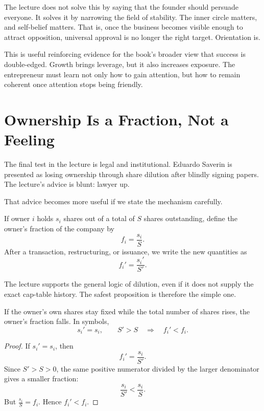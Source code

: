 \documentclass[11pt,oneside]{book}
\begin{document}
The lecture does not solve this by saying that the founder should persuade everyone. It solves it by narrowing the field of stability. The inner circle matters, and self-belief matters. That is, once the business becomes visible enough to attract opposition, universal approval is no longer the right target. Orientation is.

This is useful reinforcing evidence for the book's broader view that success is double-edged. Growth brings leverage, but it also increases exposure. The entrepreneur must learn not only how to gain attention, but how to remain coherent once attention stops being friendly.

\section{Ownership Is a Fraction, Not a Feeling}

The final test in the lecture is legal and institutional. Eduardo Saverin is presented as losing ownership through share dilution after blindly signing papers. The lecture's advice is blunt: lawyer up.

That advice becomes more useful if we state the mechanism carefully.

\begin{definition}
If owner \(i\) holds \(s_i\) shares out of a total of \(S\) shares outstanding, define the owner's fraction of the company by
\begin{equation}
f_i = \frac{s_i}{S}.
\end{equation}
After a transaction, restructuring, or issuance, we write the new quantities as
\begin{equation}
f_i' = \frac{s_i'}{S'}.
\end{equation}
\end{definition}

The lecture supports the general logic of dilution, even if it does not supply the exact cap-table history. The safest proposition is therefore the simple one.

\begin{proposition}
If the owner's own shares stay fixed while the total number of shares rises, the owner's fraction falls. In symbols,
\begin{equation}
s_i' = s_i,
\qquad
S' > S
\quad \Longrightarrow \quad
f_i' < f_i.
\end{equation}
\end{proposition}

\begin{proof}
If \(s_i' = s_i\), then
\[
f_i' = \frac{s_i}{S'}.
\]
Since \(S' > S > 0\), the same positive numerator divided by the larger denominator gives a smaller fraction:
\[
\frac{s_i}{S'} < \frac{s_i}{S}.
\]
But \(\frac{s_i}{S} = f_i\). Hence \(f_i' < f_i\).
\end{proof}
\end{document}
